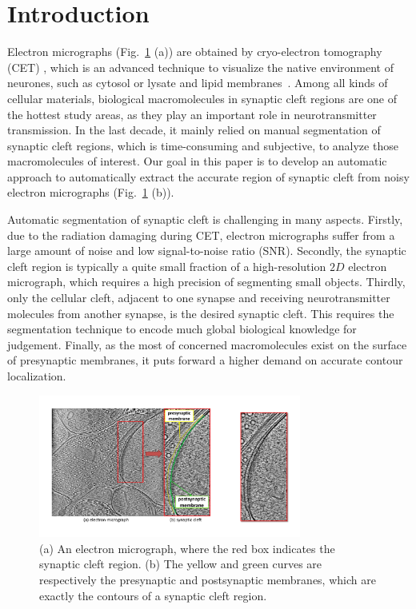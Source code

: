 \section{Introduction}
\label{sec:intro}
Electron micrographs (Fig.~\ref{fig:img} (a)) are obtained by cryo-electron tomography (CET) \cite{Hawkes2007}, which is an advanced technique to visualize the native environment of neurones, such as cytosol or lysate and lipid membranes~\cite{Lucic2005a}.
%
Among all kinds of cellular materials, biological macromolecules in synaptic cleft regions are one of the hottest study areas, as they play an important role in neurotransmitter transmission.
%
In the last decade, it mainly relied on manual segmentation of synaptic cleft regions, which is time-consuming and subjective, to analyze those macromolecules of interest.
%
Our goal in this paper is to develop an automatic approach to automatically extract the accurate region of synaptic cleft from noisy electron micrographs (Fig.~\ref{fig:img} (b)).


Automatic segmentation of synaptic cleft is challenging in many aspects.
Firstly, due to the radiation damaging during CET, electron micrographs suffer from a large amount of noise and low signal-to-noise ratio (SNR).
Secondly, the synaptic cleft region is typically a quite small fraction of a high-resolution $2D$ electron micrograph, which requires a high precision of segmenting small objects.
Thirdly, only the cellular cleft, adjacent to one synapse and receiving neurotransmitter molecules from another synapse, is the desired synaptic cleft. This requires the segmentation technique to encode much global biological knowledge for judgement.
Finally, as the most of concerned macromolecules exist on the surface of presynaptic membranes, it puts forward a higher demand on accurate contour localization.

\begin{figure}[t]
    \begin{center}
        \includegraphics[width=3.4in]{figs/FigImg.pdf}
   \end{center}
\caption{(a) An electron micrograph, where the red box indicates the synaptic cleft region.
            (b) The yellow and green curves are respectively the presynaptic and postsynaptic membranes, which are exactly the contours of a synaptic cleft region.  }
\label{fig:img}
\end{figure}


